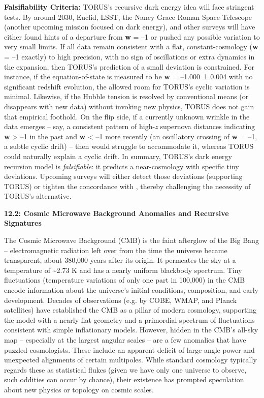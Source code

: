 \documentclass[
]{article}
\begin{document}
\textbf{Falsifiability Criteria:} TORUS's recursive dark energy idea
will face stringent tests. By around 2030, Euclid, LSST, the Nancy Grace
Roman Space Telescope (another upcoming mission focused on dark energy),
and other surveys will have either found hints of a departure from
\textbf{w} = --1 or pushed any possible variation to very small limits.
If all data remain consistent with a flat, constant-\Lambda cosmology
(\textbf{w} = --1 exactly) to high precision, with no sign of
oscillations or extra dynamics in the expansion, then TORUS's prediction
of a small deviation is constrained. For instance, if the
equation-of-state is measured to be \textbf{w} = --1.000 ± 0.004 with no
significant redshift evolution, the allowed room for TORUS's cyclic
variation is minimal. Likewise, if the Hubble tension is resolved by
conventional means (or disappears with new data) without invoking new
physics, TORUS does not gain that empirical foothold. On the flip side,
if a currently unknown wrinkle in the data emerges -- say, a consistent
pattern of high-\emph{z} supernova distances indicating \textbf{w}
\textgreater{} --1 in the past and \textbf{w} \textless{} --1 more
recently (an oscillatory crossing of \textbf{w} = --1, a subtle cyclic
drift) -- then \LambdaCDM would struggle to accommodate it, whereas TORUS
could naturally explain a cyclic drift. In summary, TORUS's dark energy
recursion model is \emph{falsifiable}: it predicts a near-\LambdaCDM cosmology
with specific tiny deviations. Upcoming surveys will either detect those
deviations (supporting TORUS) or tighten the concordance with \LambdaCDM,
thereby challenging the necessity of TORUS's alternative.

\textbf{12.2: Cosmic Microwave Background Anomalies and Recursive
Signatures}

The Cosmic Microwave Background (CMB) is the faint afterglow of the Big
Bang -- electromagnetic radiation left over from the time the universe
became transparent, about 380,000 years after its origin. It permeates
the sky at a temperature of \textasciitilde2.73 K and has a nearly
uniform blackbody spectrum. Tiny fluctuations (temperature variations of
only one part in 100,000) in the CMB encode information about the
universe's initial conditions, composition, and early development.
Decades of observations (e.g. by COBE, WMAP, and Planck satellites) have
established the CMB as a pillar of modern cosmology, supporting the \LambdaCDM
model with a nearly flat geometry and a primordial spectrum of
fluctuations consistent with simple inflationary models. However, hidden
in the CMB's all-sky map -- especially at the largest angular scales --
are a few anomalies that have puzzled cosmologists. These include an
apparent deficit of large-angle power and unexpected alignments of
certain multipoles. While standard cosmology typically regards these as
statistical flukes (given we have only one universe to observe, such
oddities can occur by chance), their existence has prompted speculation
about new physics or topology on cosmic scales.
\end{document}
